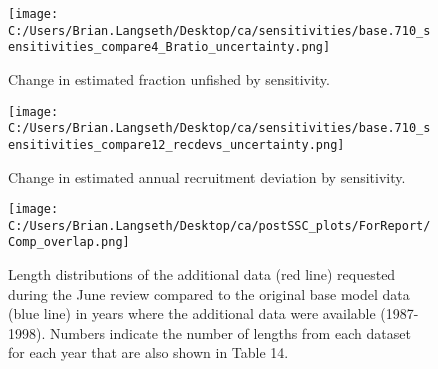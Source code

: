 \documentclass[11pt,
  english,
  a4paper,
]{article}
\begin{document}
\tagmcend\tagstructend


\begin{figure}
\centering
\texttt{[image: C:/Users/Brian.Langseth/Desktop/ca/sensitivities/base.710\_sensitivities\_compare4\_Bratio\_uncertainty.png]}
\caption{Change in estimated fraction unfished by sensitivity.\label{fig:sens-depl}}
\end{figure}

\tagmcend\tagstructend


\begin{figure}
\centering
\texttt{[image: C:/Users/Brian.Langseth/Desktop/ca/sensitivities/base.710\_sensitivities\_compare12\_recdevs\_uncertainty.png]}
\caption{Change in estimated annual recruitment deviation by sensitivity.\label{fig:sens-recdev}}
\end{figure}

\tagmcend\tagstructend


\begin{figure}
\centering
\texttt{[image: C:/Users/Brian.Langseth/Desktop/ca/postSSC\_plots/ForReport/Comp\_overlap.png]}
\caption{Length distributions of the additional data (red line) requested during the June review compared to the original base model data (blue line) in years where the additional data were available (1987-1998). Numbers indicate the number of lengths from each dataset for each year that are also shown in Table 14.\label{fig:sens-debWV-comp}}
\end{figure}

\tagmcend\tagstructend

\end{document}
